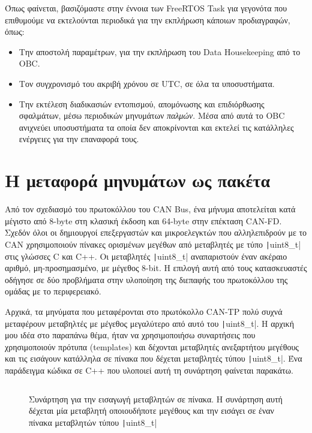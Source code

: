 \documentclass[a4paper,nobib,justified]{tufte-book}
\begin{document}
Όπως φαίνεται, βασιζόμαστε στην έννοια των FreeRTOS Task για γεγονότα που επιθυμούμε να εκτελούνται περιοδικά για την εκπλήρωση κάποιων προδιαγραφών, όπως:
\begin{itemize}
	\item Την αποστολή παραμέτρων, για την εκπλήρωση του Data Housekeeping από το OBC.
	\item Τον συγχρονισμό του ακριβή χρόνου σε UTC, σε όλα τα υποσυστήματα.
	\item Την εκτέλεση διαδικασιών εντοπισμού, απομόνωσης και επιδιόρθωσης σφαλμάτων, μέσω περιοδικών μηνυμάτων \emph{παλμών}. Μέσα από αυτά το OBC ανιχνεύει υποσυστήματα τα οποία δεν αποκρίνονται και εκτελεί τις κατάλληλες ενέργειες για την επαναφορά τους. 
\end{itemize}

\section{Η μεταφορά μηνυμάτων ως πακέτα}

Από τον σχεδιασμό του πρωτοκόλλου του CAN Bus, ένα μήνυμα αποτελείται κατά μέγιστο από 8-byte στη κλασική έκδοση και 64-byte στην επέκταση CAN-FD. Σχεδόν όλοι οι δημιουργοί επεξεργαστών και μικροελεγκτών που αλληλεπιδρούν με το CAN χρησιμοποιούν πίνακες ορισμένων μεγέθων από μεταβλητές με τύπο \texttt|uint8_t| στις γλώσσες C και C++. Οι μεταβλητές \texttt|uint8_t| αναπαριστούν έναν ακέραιο αριθμό, μη-προσημασμένο, με μέγεθος 8-bit.  Η επιλογή αυτή από τους κατασκευαστές οδήγησε σε δύο προβλήματα στην υλοποίηση της διεπαφής του πρωτοκόλλου της ομάδας με το περιφερειακό.

Αρχικά, τα μηνύματα που μεταφέρονται στο πρωτόκολλο CAN-TP πολύ συχνά μεταφέρουν μεταβηλτές με μέγεθος μεγαλύτερο από αυτό του \texttt|uint8_t|. Η αρχική μου ιδέα στο παραπάνω θέμα, ήταν να χρησιμοποιήσω συναρτήσεις που χρησιμοποιούν πρότυπα (templates) και δέχονται μεταβλητές ανεξαρτήτου μεγέθους και τις εισάγουν κατάλληλα σε πίνακα που δέχεται μεταβλητές τύπου \texttt|uint8_t|. Ένα παράδειγμα κώδικα σε C++ που υλοποιεί αυτή τη συνάρτηση φαίνεται παρακάτω. 

\begin{figure}
	\inputminted{cpp}{code/examples/stuffInVector.cpp}
	\label{code:stuffInVector}
	\caption[Συνάρτηση για την εισαγωγή μεταβλητών σε πίνακα]{Συνάρτηση για την εισαγωγή μεταβλητών σε πίνακα. Η συνάρτηση αυτή δέχεται μία μεταβλητή οποιουδήποτε μεγέθους και την εισάγει σε έναν πίνακα μεταβλητών τύπου \texttt|uint8_t|}
\end{figure}
\end{document}
